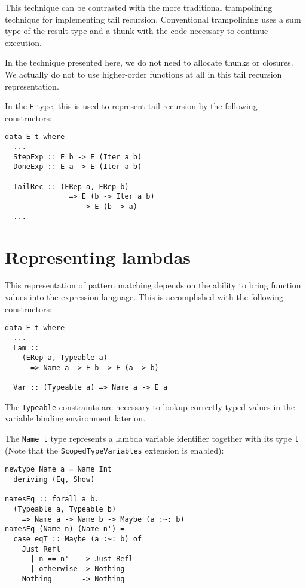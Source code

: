 \documentclass[sigplan,anonymous,review]{acmart}
\newcommand{\ttt}{\texttt}
\begin{document}
This technique can be contrasted with the more traditional trampolining
technique for implementing tail recursion. Conventional trampolining uses a
sum type of the result type and a thunk with the code necessary to continue
execution.~\cite{Ganz:99:Trampolined}

In the technique presented here, we do not need to allocate thunks or closures.
We actually do not to use higher-order functions at all in this tail recursion
representation.

In the \ttt{E} type, this is used to represent tail recursion by
the following constructors:

\begin{lstlisting}
data E t where
  ...
  StepExp :: E b -> E (Iter a b)
  DoneExp :: E a -> E (Iter a b)

  TailRec :: (ERep a, ERep b)
               => E (b -> Iter a b)
                  -> E (b -> a)
  ...
\end{lstlisting}

\section{Representing lambdas}
This representation of pattern matching depends on the ability to bring
function values into the expression language. This is accomplished
with the following constructors:

\begin{lstlisting}
data E t where
  ...
  Lam ::
    (ERep a, Typeable a)
      => Name a -> E b -> E (a -> b)

  Var :: (Typeable a) => Name a -> E a
\end{lstlisting}

The \ttt{Typeable} constraints are necessary to lookup correctly typed
values in the variable binding environment later on.

The \ttt{Name t} type represents a lambda variable identifier together with its
type \ttt{t} (Note that the \ttt{ScopedTypeVariables} extension is enabled):

\begin{lstlisting}
newtype Name a = Name Int
  deriving (Eq, Show)

namesEq :: forall a b.
  (Typeable a, Typeable b)
    => Name a -> Name b -> Maybe (a :~: b)
namesEq (Name n) (Name n') =
  case eqT :: Maybe (a :~: b) of
    Just Refl
      | n == n'   -> Just Refl
      | otherwise -> Nothing
    Nothing       -> Nothing
\end{lstlisting}
\end{document}
